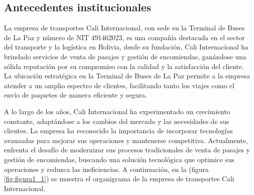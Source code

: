 	
	\subsection{Antecedentes institucionales}
	
	La empresa de transportes Cali Internacional, con sede en la Terminal de Buses de La Paz y número de NIT 491462023, es una compañía destacada en el sector del transporte y la logística en Bolivia, desde su fundación, Cali Internacional ha brindado servicios de venta de pasajes y gestión de encomiendas, ganándose una sólida reputación por su compromiso con la calidad y la satisfacción del cliente. La ubicación estratégica en la Terminal de Buses de La Paz permite a la empresa atender a un amplio espectro de clientes, facilitando tanto los viajes como el envío de paquetes de manera eficiente y segura.
	
	A lo largo de los años, Cali Internacional ha experimentado un crecimiento constante, adaptándose a los cambios del mercado y las necesidades de sus clientes. La empresa ha reconocido la importancia de incorporar tecnologías avanzadas para mejorar sus operaciones y mantenerse competitiva. Actualmente, enfrenta el desafío de modernizar sus procesos tradicionales de venta de pasajes y gestión de encomiendas, buscando una solución tecnológica que optimice sus operaciones y reduzca las ineficiencias. A continuación, en la (figura \ref{fig:figura1_1}) se muestra el organigrama de la empresa de transportes Cali Internacional.
	
	\vspace{0.3cm} %
	
